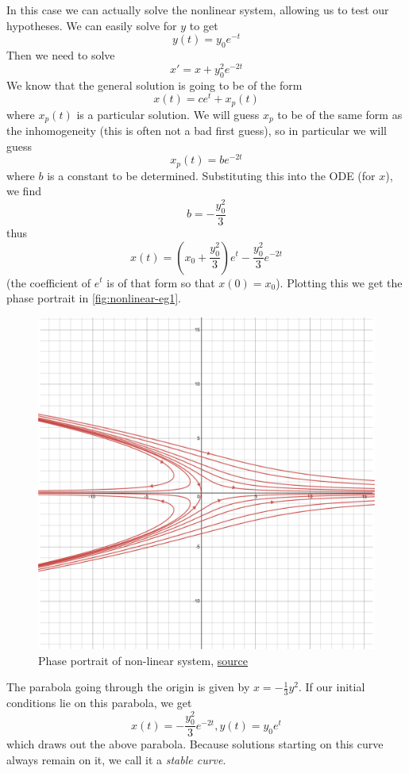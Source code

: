 In this case we can actually solve the nonlinear system, allowing us to test our hypotheses.
We can easily solve for $y$ to get
$$ y(t) = y_0 e^{-t} $$
Then we need to solve
$$ x' = x + y_0^2 e^{-2t} $$
We know that the general solution is going to be of the form
$$ x(t) = ce^{t} + x_p(t) $$
where $x_p(t)$ is a particular solution. We will guess $x_p$ to be of the same form as the inhomogeneity (this is often not a bad first guess), so in particular we will guess
$$ x_p(t) = be^{-2t} $$
where $b$ is a constant to be determined. Substituting this into the ODE (for $x$), we find
$$ b = -\frac{y_0^2}{3} $$
thus
$$ x(t) = \left( x_0 + \frac{y_0^2}{3}  \right)e^{t}  -\frac{y_0^2}{3} e^{-2t}$$
(the coefficient of $e^t$ is of that form so that $x(0) = x_0$). Plotting this we get the phase portrait in \autoref{fig:nonlinear-eg1}.

\begin{figure}[h]
    \centering
    \includegraphics[scale=0.17]{Images/nonlinear_eg1.png}
    \caption{Phase portrait of non-linear system,  \href{https://www.desmos.com/calculator/hda60sxrdf}{source}}
    \label{fig:nonlinear-eg1}
\end{figure}

The parabola going through the origin is given by $x = -\frac{1}{3}y^2$. If our initial conditions lie on this parabola, we get
$$ x(t) = -\frac{y_0^2}{3} e^{-2t}, y(t) = y_0e^{t} $$
which draws out the above parabola. Because solutions starting on this curve always remain on it, we call it a \textit{stable curve}.

